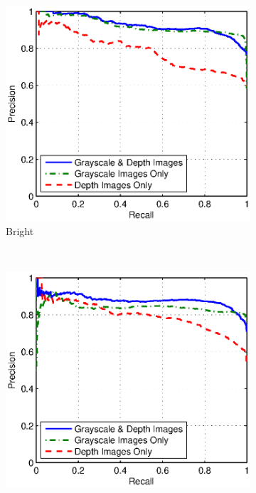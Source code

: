 \documentclass[]{spie}  %
\begin{document}
\begin{figure}
        \centering
        
        \begin{subfigure}[b]{0.43\textwidth}
        \centering
        \includegraphics[trim = 0mm 0mm 5mm 0mm, clip, width=\textwidth]{figures/pr_bright.eps}    
        \caption{Bright}
        \label{subfig:pr_bright}
        \end{subfigure}
        ~ 
        \begin{subfigure}[b]{0.43\textwidth}
        \centering
        \includegraphics[trim = 0mm 0mm 5mm 0mm, clip, width=\textwidth]{figures/pr_dim.eps}    

\end{subfigure}
\end{figure}
\end{document}
